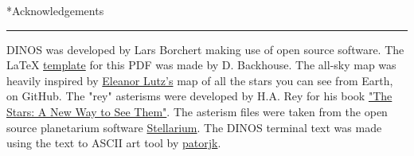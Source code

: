 \documentclass[12pt,preprintnumbers,amsmath,amssymb,nofootinbib,superscriptaddress]{revtex4-1}
\begin{document}
\newpage

*{Acknowledgements}
\vspace{-0.2cm}\hrule
\vspace{1cm}

DINOS was developed by Lars Borchert making use of open source software.
The LaTeX \href{https://www.overleaf.com/latex/templates/academic-presentation-template/jpgfpsstrwzd}{template} for this PDF was made by D. Backhouse.
The all-sky map was heavily inspired by \href{https://github.com/eleanorlutz/western_constellations_atlas_of_space}{Eleanor Lutz's} map of all the stars you can see from Earth, on GitHub.
The "rey" asterisms were developed by H.A. Rey for his book \href{https://en.wikipedia.org/wiki/The_Stars:_A_New_Way_to_See_Them}{"The Stars: A New Way to See Them"}.
The asterism files were taken from the open source planetarium software \href{https://stellarium.org/}{Stellarium}.
The DINOS terminal text was made using the text to ASCII art tool by \href{http://patorjk.com/software/taag/#p=display&f=Bi}{patorjk}.
\end{document}
